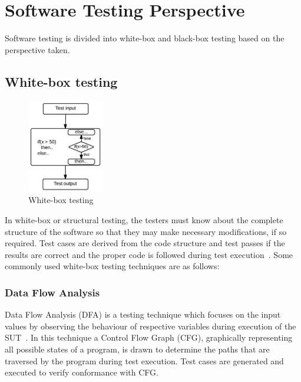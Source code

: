 \section{Software Testing Perspective}
Software testing is divided into white-box and black-box testing based on the perspective taken.

\subsection{White-box testing}
\begin{figure}
  \vspace{-35pt}
  \begin{center}
   \includegraphics[width=0.30\textwidth]{chapter2/whiteBox.png}
  \end{center}
  \vspace{-20pt}
  \bigskip
  \caption{White-box testing}
 \vspace{-18pt}
\end{figure}
In white-box or structural testing, the testers must know about the complete structure of the software so that they may make necessary modifications, if so required. Test cases are derived from the code structure and test passes if the results are correct and the proper code is followed during test execution~\cite{ostrand2002white}. Some commonly used white-box testing techniques are as follows:


\subsubsection{Data Flow Analysis}
Data Flow Analysis (DFA) is a testing technique which focuses on the input values by observing the behaviour of respective variables during execution of the SUT~\cite{clarke1989formal}. In this technique a Control Flow Graph (CFG), graphically representing all possible states of a program, is drawn to determine the paths that are traversed by the program during test execution. Test cases are generated and executed to verify conformance with CFG. 

